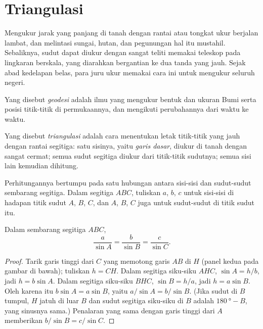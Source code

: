 \section{Triangulasi}

Mengukur jarak yang panjang di tanah dengan rantai atau tongkat ukur berjalan
lambat, dan melintasi sungai, hutan, dan pegunungan hal itu mustahil.
Sebaliknya, sudut dapat diukur dengan sangat teliti memakai teleskop pada
lingkaran berskala, yang diarahkan bergantian ke dua tanda yang jauh. Sejak
abad kedelapan belas, para juru ukur memakai cara ini untuk mengukur seluruh
negeri.

\begin{definition}[Geodesi]\label{def:g10:measuring-the-earth:geodesy}
Yang disebut \emph{geodesi} adalah ilmu yang mengukur bentuk
dan ukuran Bumi serta posisi titik-titik di permukaannya, dan mengikuti
perubahannya dari waktu ke waktu.
\end{definition}

\begin{definition}[Triangulasi]\label{def:g10:measuring-the-earth:triangulation}
Yang disebut \emph{triangulasi} adalah cara menentukan
letak titik-titik yang jauh dengan rantai segitiga: satu sisinya, yaitu
\emph{garis dasar}, diukur di tanah dengan sangat cermat; semua sudut
segitiga diukur dari titik-titik sudutnya; semua sisi lain kemudian dihitung.
\end{definition}

Perhitungannya bertumpu pada satu hubungan antara sisi-sisi dan sudut-sudut
sembarang segitiga. Dalam segitiga $ABC$, tuliskan $a$, $b$, $c$ untuk
sisi-sisi di hadapan titik sudut $A$, $B$, $C$, dan $A$, $B$, $C$ juga untuk
sudut-sudut di titik sudut itu.

\begin{proposition}\label{prop:g10:measuring-the-earth:sine-rule}
Dalam sembarang segitiga $ABC$,
\[
  \frac{a}{\sin A} = \frac{b}{\sin B} = \frac{c}{\sin C}.
\]
\end{proposition}

\begin{proof}
Tarik garis tinggi dari $C$ yang memotong garis $AB$ di $H$ (panel kedua pada
gambar di bawah); tuliskan $h = CH$. Dalam segitiga siku-siku $AHC$,
$\sin A = h/b$, jadi $h = b \sin A$. Dalam segitiga siku-siku $BHC$,
$\sin B = h/a$, jadi $h = a \sin B$. Oleh karena itu $b \sin A = a \sin B$,
yaitu $a/\sin A = b/\sin B$. (Jika sudut di $B$ tumpul, $H$ jatuh di luar
$B$ dan sudut segitiga siku-siku di $B$ adalah $\qty{180}{\degree} - B$, yang
sinusnya sama.) Penalaran yang sama dengan garis tinggi dari $A$ memberikan
$b/\sin B = c/\sin C$.
\end{proof}


